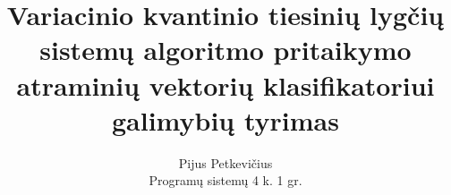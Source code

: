 \documentclass{VUMIFSlides}
\title[Variacinio kvantinio tiesinių lygčių sistemų algoritmo pritaikymo  atraminių vektorių klasifikatoriui galimybių tyrimas]{Variacinio kvantinio tiesinių lygčių sistemų algoritmo pritaikymo  atraminių vektorių klasifikatoriui galimybių tyrimas}
\author[Pijus Petkevičius]{Pijus Petkevičius\\Programų sistemų 4 k. 1 gr.}
\institute[VU MIF] 
{
Vilniaus Universitetas \\ 
\medskip
Pijus.Petkevicius@mif.stud.vu.lt
}
\begin{document}
\begin{frame}
  \maketitle
\end{frame}







\end{document}
